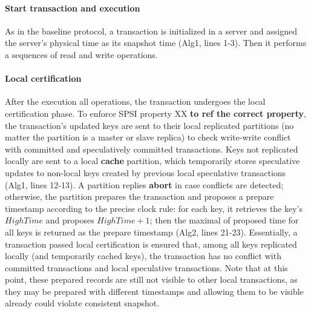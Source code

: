 \paragraph{Start transaction and execution} As in the baseline protocol, a transaction is initialized in a server and assigned the server's physical time as its snapshot time (Alg1, lines 1-3). Then it performs a sequences of read and write operations.

\paragraph{Local certification} After the execution all operations, the transaction undergoes the local certification phase. To enforce SPSI property XX \textbf{to ref the correct property}, the transaction's updated keys are sent to their local replicated partitions (no matter the partition is a master or slave replica) to check write-write conflict with committed and speculatively committed transactions. Keys not replicated locally are sent to a local \textbf{cache} partition, which temporarily stores speculative updates to non-local keys created by previous local speculative transactions (Alg1, lines 12-13). A partition replies \textbf{abort} in case conflicts are detected; otherwise, the partition prepares the transaction and proposes a prepare timestamp according to the precise clock rule: for each key, it retrieves the key's $HighTime$ and proposes $HighTime+1$; then the maximal of proposed time for all keys is returned as the prepare timestamp (Alg2, lines 21-23). Essentially, a transaction passed local certification is ensured that, among all keys replicated locally (and temporarily cached keys), the transaction has no conflict with committed transactions and local speculative transactions. Note that at this point, these prepared records are still not visible to other local transactions, as they may be prepared with different timestamps and allowing them to be visible already could violate consistent snapshot.

